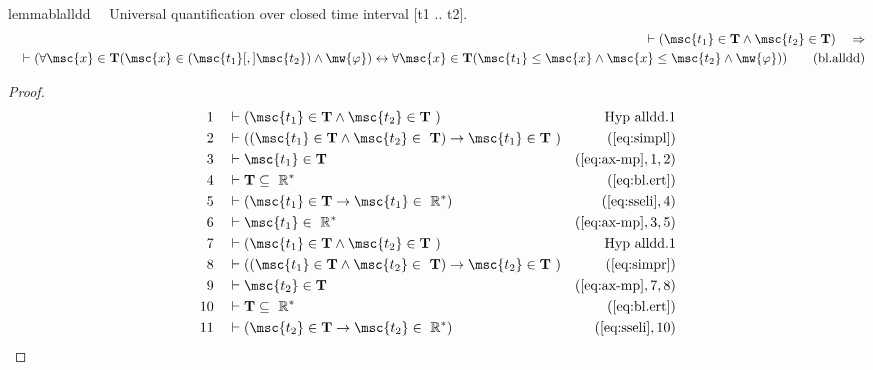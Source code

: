 \begin{restatable}{lemma}{blalldd}~~ Universal quantification over closed time
interval [t1 .. t2].
\begin{align}
\vdash ( \msc{t_1} \in \mathbf{T} \wedge \msc{t_2} \in \mathbf{T}
    )\quad\Rightarrow \notag \\ 
	\quad \vdash ( \forall \msc{x} \in \mathbf{T} ( \msc{x}
    \in ( \msc{t_1} [,] \msc{t_2} ) \wedge \mw{\varphi} ) \leftrightarrow
    \forall \msc{x} \in \mathbf{T} ( \msc{t_1} \le \msc{x} \wedge \msc{x} \le
    \msc{t_2} \wedge \mw{\varphi} ) )\label{eq:bl.alldd}\tag{bl.alldd}
\end{align}
\end{restatable}

\begin{proof}
\begin{align}
  1 &&  & \vdash ( \msc{t_1} \in \mathbf{T} \wedge \msc{t_2} \in \mathbf{T}
     ~)&\text{Hyp~alldd.1}\notag%
  \\ 2 &&  & \vdash ( ( \msc{t_1} \in \mathbf{T} \wedge \msc{t_2} \in
     ~\mathbf{T} ) \rightarrow \msc{t_1} \in \mathbf{T}
     ~)&(\mbox{\ref{eq:simpl}})\notag
  \\ 3 &&  & \vdash \msc{t_1} \in \mathbf{T}&(\mbox{\ref{eq:ax-mp}},1,2)\notag
  \\ 4 &&  & \vdash \mathbf{T} \subseteq
     ~\mathbb{R}^{*}&(\mbox{\ref{eq:bl.ert}})\notag
  \\ 5 &&  & \vdash ( \msc{t_1} \in \mathbf{T} \rightarrow \msc{t_1} \in
     ~\mathbb{R}^{*} )&(\mbox{\ref{eq:sseli}},4)\notag
  \\ 6 &&  & \vdash \msc{t_1} \in
     ~\mathbb{R}^{*}&(\mbox{\ref{eq:ax-mp}},3,5)\notag
  \\ 7 &&  & \vdash ( \msc{t_1} \in \mathbf{T} \wedge \msc{t_2} \in \mathbf{T}
     ~)&\text{Hyp~alldd.1}\notag%
  \\ 8 &&  & \vdash ( ( \msc{t_1} \in \mathbf{T} \wedge \msc{t_2} \in
     ~\mathbf{T} ) \rightarrow \msc{t_2} \in \mathbf{T}
     ~)&(\mbox{\ref{eq:simpr}})\notag
  \\ 9 &&  & \vdash \msc{t_2} \in \mathbf{T}&(\mbox{\ref{eq:ax-mp}},7,8)\notag
  \\ 10 &&  & \vdash \mathbf{T} \subseteq
     ~\mathbb{R}^{*}&(\mbox{\ref{eq:bl.ert}})\notag
  \\ 11 &&  & \vdash ( \msc{t_2} \in \mathbf{T} \rightarrow \msc{t_2} \in
     ~\mathbb{R}^{*} )&(\mbox{\ref{eq:sseli}},10)\notag

\end{align}
\end{proof}
